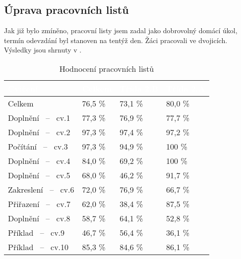 \subsection{Úprava pracovních listů}
{Jak již bylo zmíněno, pracovní listy jsem zadal jako dobrovolný domácí úkol, termín odevzdání byl stanoven na tentýž den. Žáci pracovali ve dvojicích. Výsledky jsou shrnuty v .}
\renewcommand{\arraystretch}{1.1}
\begin{table}[H]
    \centering
    \begin{tabular}{|p{3.3cm}|p{2cm}|p{2cm}|p{2cm}|}
        \hline
        \rowcolor{black!60}
        \textcolor{white}{Cvičení} & \textcolor{white}{Celkem} &\textcolor{white}{Třída 2.B} & \textcolor{white}{Třída 2.A} \\
        \hline
        Celkem & \hfill 76,5 \% & \hfill 73,1 \% & \hfill 80,0 \% \\
        \hline
        Doplnění \hfill ~--~ cv.1 & \hfill 77,3 \% & \hfill 76,9 \% & \hfill 77,7 \% \\
        \hline
        Doplnění \hfill ~--~ cv.2 & \hfill 97,3 \% & \hfill 97,4 \% & \hfill 97,2 \% \\
        \hline
        Počítání \hfill ~--~ cv.3 & \hfill 97,3 \% & \hfill  94,9 \% &\hfill  100 \% \\
        \hline
        Doplnění \hfill ~--~ cv.4 & \hfill 84,0 \% & \hfill  69,2 \% &\hfill  100 \% \\
        \hline
        Doplnění \hfill ~--~ cv.5 & \hfill 68,0 \% & \hfill 46,2 \% & \hfill 91,7 \% \\
        \hline
        Zakreslení \hfill ~--~ cv.6 & \hfill 72,0 \% & \hfill 76,9 \% & \hfill 66,7 \% \\
        \hline
        Přiřazení \hfill ~--~ cv.7 & \hfill 62,0 \% & \hfill 38,4 \% & \hfill 87,5 \% \\
        \hline
        Doplnění \hfill ~--~ cv.8 & \hfill 58,7 \% & \hfill 64,1 \% & \hfill 52,8 \% \\
        \hline
        Příklad \hfill ~--~ cv.9 & \hfill 46,7 \% & \hfill 56,4 \% & \hfill 36,1 \% \\
        \hline
        Příklad \hfill ~--~ cv.10 & \hfill 85,3 \% & \hfill 84,6 \% & \hfill 86,1 \% \\
        \hline
    \end{tabular}
    \caption{Hodnocení pracovních listů \jaTab}
    \label{tab:vysledkyPracovnichListu}
\end{table}
